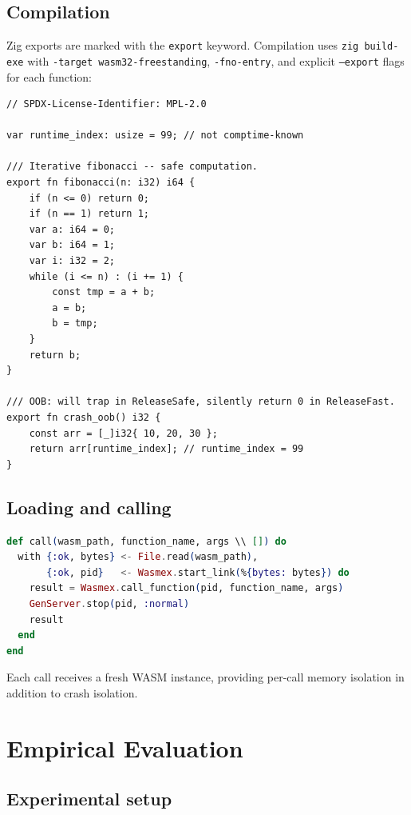 \documentclass[11pt,a4paper]{article}
\begin{document}
\subsection{Compilation}

Zig exports are marked with the \texttt{export} keyword. Compilation uses
\texttt{zig build-exe} with \texttt{-target wasm32-freestanding},
\texttt{-fno-entry}, and explicit \texttt{--export} flags for each function:

\begin{lstlisting}[language=Zig, caption={Example SNIF function}]
// SPDX-License-Identifier: MPL-2.0

var runtime_index: usize = 99; // not comptime-known

/// Iterative fibonacci -- safe computation.
export fn fibonacci(n: i32) i64 {
    if (n <= 0) return 0;
    if (n == 1) return 1;
    var a: i64 = 0;
    var b: i64 = 1;
    var i: i32 = 2;
    while (i <= n) : (i += 1) {
        const tmp = a + b;
        a = b;
        b = tmp;
    }
    return b;
}

/// OOB: will trap in ReleaseSafe, silently return 0 in ReleaseFast.
export fn crash_oob() i32 {
    const arr = [_]i32{ 10, 20, 30 };
    return arr[runtime_index]; // runtime_index = 99
}
\end{lstlisting}

\subsection{Loading and calling}

\begin{lstlisting}[language=Elixir, caption={SNIF loader (snif\_demo/loader.ex)}]
def call(wasm_path, function_name, args \\ []) do
  with {:ok, bytes} <- File.read(wasm_path),
       {:ok, pid}   <- Wasmex.start_link(%{bytes: bytes}) do
    result = Wasmex.call_function(pid, function_name, args)
    GenServer.stop(pid, :normal)
    result
  end
end
\end{lstlisting}

Each call receives a fresh WASM instance, providing per-call memory isolation
in addition to crash isolation.

\section{Empirical Evaluation}
\label{sec:evaluation}

\subsection{Experimental setup}
\end{document}
